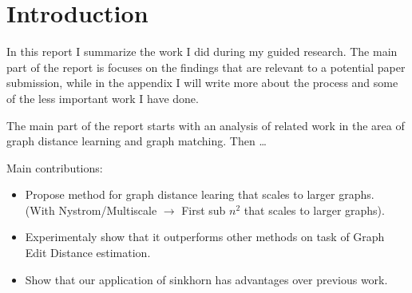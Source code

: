 \section{Introduction}

In this report I summarize the work I did during my guided research. The main part of the report is focuses on the findings that are relevant to a potential paper submission, while in the appendix I will write more about the process and some of the less important work I have done.

The main part of the report starts with an analysis of related work in the area of graph distance learning and graph matching. Then \dots

Main contributions:
\begin{itemize}
    \item Propose method for graph distance learing that scales to larger graphs. \\ (With Nystrom/Multiscale $\rightarrow$ First sub $n^2$ that scales to larger graphs).
    \item Experimentaly show that it outperforms other methods on task of Graph Edit Distance estimation.
    \item Show that our application of sinkhorn has advantages over previous work.
\end{itemize}
